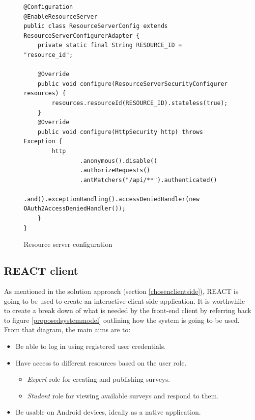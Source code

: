 \begin{figure}[ht]
    \centering
    \begin{lstlisting}
@Configuration
@EnableResourceServer
public class ResourceServerConfig extends ResourceServerConfigurerAdapter {
    private static final String RESOURCE_ID = "resource_id";

    @Override
    public void configure(ResourceServerSecurityConfigurer resources) {
        resources.resourceId(RESOURCE_ID).stateless(true);
    }
    @Override
    public void configure(HttpSecurity http) throws Exception {
        http
                .anonymous().disable()
                .authorizeRequests()
                .antMatchers("/api/**").authenticated()
                .and().exceptionHandling().accessDeniedHandler(new OAuth2AccessDeniedHandler());
    } 
}
    \end{lstlisting}
    \caption{Resource server configuration}
    \label{resourceserverconfig}
\end{figure}



\clearpage
\subsection{REACT client}
As mentioned in the solution approach (section \ref{chosenclientside}), REACT is going to be used to create an interactive client
side application.
It is worthwhile to create a break down of what is needed by the 
front-end client by referring back to figure \ref{proposedsystemmodel} outlining how the system is going to be used.
From that diagram, the main aims are to: 

\begin{itemize}
    \tightlist
    \item Be able to log in using registered user credentials.
    \item Have access to different resources based on the user role.
    \begin{itemize}
        \item \textit{Expert} role for creating and publishing surveys.
        \item \textit{Student} role for viewing available surveys and respond to them.
    \end{itemize}
    \item Be usable on Android devices, ideally as a native application.
\end{itemize}

